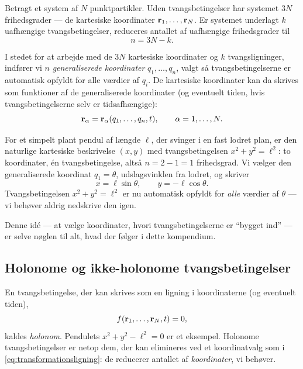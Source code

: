 Betragt et system af $N$ punktpartikler. Uden tvangsbetingelser har
systemet $3N$ frihedsgrader — de kartesiske koordinater
$\vb{r}_1,\dots,\vb{r}_N$. Er systemet underlagt $k$ uafhængige
tvangsbetingelser, reduceres antallet af uafhængige frihedsgrader til
\begin{equation}
  n = 3N - k.
\end{equation}

I stedet for at arbejde med de $3N$ kartesiske koordinater og $k$
tvangsligninger, indfører vi $n$ \emph{generaliserede
koordinater}
$q_1,\dots,q_n$, valgt så tvangsbetingelserne er automatisk opfyldt for
alle værdier af $q_i$. De kartesiske koordinater kan da skrives som
funktioner af de generaliserede koordinater (og eventuelt tiden, hvis
tvangsbetingelserne selv er tidsafhængige):
\begin{equation}
  \vb{r}_\alpha = \vb{r}_\alpha(q_1,\dots,q_n,t), \qquad \alpha = 1,\dots,N.
  \label{eq:transformationsligning}
\end{equation}

\begin{eksempel}
For et simpelt plant pendul af længde $\ell$, der svinger i en fast
lodret plan, er den naturlige kartesiske beskrivelse $(x,y)$ med
tvangsbetingelsen $x^2+y^2=\ell^2$: to koordinater, én
tvangsbetingelse, altså $n = 2-1=1$ frihedsgrad. Vi vælger den
generaliserede koordinat $q_1=\theta$, udslagsvinklen fra lodret, og
skriver
\begin{equation}
  x = \ell\sin\theta, \qquad y = -\ell\cos\theta.
\end{equation}
Tvangsbetingelsen $x^2+y^2=\ell^2$ er nu automatisk opfyldt for
\emph{alle} værdier af $\theta$ — vi behøver aldrig nedskrive den igen.
\end{eksempel}

Denne idé — at vælge koordinater, hvori tvangsbetingelserne er ``bygget
ind'' — er selve nøglen til alt, hvad der følger i dette kompendium.

\subsection{Holonome og ikke-holonome tvangsbetingelser}

En tvangsbetingelse, der kan skrives som en ligning i koordinaterne (og
eventuelt tiden),
\begin{equation}
  f(\vb{r}_1,\dots,\vb{r}_N,t) = 0,
\end{equation}
kaldes \emph{holonom}. Pendulets $x^2+y^2-\ell^2=0$ er et eksempel.
Holonome tvangsbetingelser er netop dem, der kan elimineres ved et
koordinatvalg som i \eqref{eq:transformationsligning}: de reducerer
antallet af \emph{koordinater}, vi behøver.

